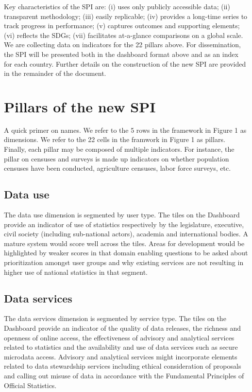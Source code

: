 \documentclass[
]{article}
\begin{document}
Key characteristics of the SPI are: (i) uses only publicly accessible data; (ii) transparent methodology; (iii) easily replicable; (iv) provides a long-time series to track progress in performance; (v) captures outcomes and supporting elements; (vi) reflects the SDGs; (vii) facilitates at-a-glance comparisons on a global scale.
We are collecting data on indicators for the 22 pillars above. For dissemination, the SPI will be presented both in the dashboard format above and as an index for each country. Further details on the construction of the new SPI are provided in the remainder of the document.

\hypertarget{pillars-of-the-new-spi}{%
\section{Pillars of the new SPI}\label{pillars-of-the-new-spi}}

A quick primer on names. We refer to the 5 rows in the framework in Figure 1 as dimensions. We refer to the 22 cells in the framwork in Figure 1 as pillars. Finally, each pillar may be composed of multiple indicators. For instance, the pillar on censuses and surveys is made up indicators on whether population censuses have been conducted, agriculture censuses, labor force surveys, etc.

\hypertarget{data-use}{%
\subsection{Data use}\label{data-use}}

The data use dimension is segmented by user type. The tiles on the Dashboard provide an indicator of use of statistics respectively by the legislature, executive, civil society (including sub-national actors), academia and international bodies. A mature system would score well across the tiles. Areas for development would be highlighted by weaker scores in that domain enabling questions to be asked about prioritization amongst user groups and why existing services are not resulting in higher use of national statistics in that segment.

\hypertarget{data-services}{%
\subsection{Data services}\label{data-services}}

The data services dimension is segmented by service type. The tiles on the Dashboard provide an indicator of the quality of data releases, the richness and openness of online access, the effectiveness of advisory and analytical services related to statistics and the availability and use of data services such as secure microdata access. Advisory and analytical services might incorporate elements related to data stewardship services including ethical consideration of proposals and calling out misuse of data in accordance with the Fundamental Principles of Official Statistics.
\end{document}
